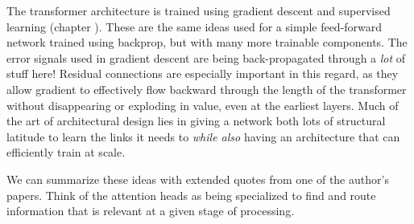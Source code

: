
The transformer architecture is trained using gradient descent and supervised
learning (chapter ). These are the same ideas used for a
simple feed-forward network trained using backprop, but with many more
trainable components. The error signals used in gradient descent are being
back-propagated through a \emph{lot} of stuff here! Residual connections are
especially important in this regard, as they allow gradient to effectively flow
backward through the length of the transformer without disappearing or
exploding in value, even at the earliest layers. Much of the art of
architectural design lies in giving a network both lots of structural latitude
to learn the links it needs to \emph{while also} having an architecture that can
efficiently train at scale.

We can summarize these ideas with extended quotes from one of the author's papers. Think of the attention heads as being specialized to find and route information that is relevant at a given stage of processing.

